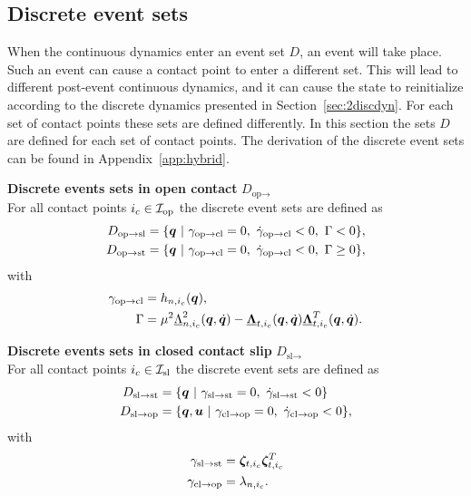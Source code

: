\documentclass[../DC2017114Bouma.tex]{subfiles}
\begin{document}
\subsection{Discrete event sets}\label{sec:2event}
When the continuous dynamics enter an event set $D$, an event will take place. Such an event can cause a contact point to enter a different set. This will lead to different post-event continuous dynamics, and it can cause the state to reinitialize according to the discrete dynamics presented in Section~\ref{sec:2discdyn}. For each set of contact points these sets are defined differently. In this section the sets $D$ are defined for each set of contact points. The derivation of the discrete event sets can be found in Appendix~\ref{app:hybrid}.

\textbf{Discrete events sets in open contact} $D_{\text{op}\rightarrow}$\\
For all contact points $i_c\in\mathcal{I}_{\text{op}}$ the discrete event sets are defined as
\begin{align}
D_{\text{op}\rightarrow\text{sl}} &= \{ \qb\ |\ \gamma_{\text{op}\rightarrow\text{cl}} = 0,\ \dot{\gamma}_{\text{op}\rightarrow\text{cl}} < 0,\ \Gamma < 0 \},\\
D_{\text{op}\rightarrow\text{st}} &= \{ \qb\ |\ \gamma_{\text{op}\rightarrow\text{cl}} = 0,\ \dot{\gamma}_{\text{op}\rightarrow\text{cl}} < 0,\ \Gamma \geq 0 \},
\end{align}
with
\begin{align}
\gamma_{\text{op}\rightarrow\text{cl}} &= h_{n,i_c}({\boldsymbol{q}}),\\
\Gamma &= \mu^2\underline{\Lambda}^2_{n,i_c}({\boldsymbol{q}},\dot{{\boldsymbol{q}}})-\underline{\boldsymbol{\Lambda}}_{t,i_c}({\boldsymbol{q}},\dot{{\boldsymbol{q}}})\underline{\boldsymbol{\Lambda}}^T_{t,i_c}({\boldsymbol{q}},\dot{{\boldsymbol{q}}}).
\end{align}

\textbf{Discrete events sets in closed contact slip} $D_{\text{sl}\rightarrow}$\\
For all contact points $i_c\in\mathcal{I}_{\text{sl}}$ the discrete event sets are defined as
\begin{align}
D_{\text{sl}\rightarrow\text{st}} &= \{ \qb\ |\ \gamma_{\text{sl}\rightarrow\text{st}} = 0,\ \dot{\gamma}_{\text{sl}\rightarrow\text{st}} < 0\}\\
D_{\text{sl}\rightarrow\text{op}} &= \{ \qb,\ub\ |\ \gamma_{\text{cl}\rightarrow\text{op}} = 0,\ \dot{\gamma}_{\text{cl}\rightarrow\text{op}} < 0\},
\end{align}
with 
\begin{align}
\gamma_{\text{sl}\rightarrow\text{st}} &= \boldsymbol{\zeta}_{t,i_c}\boldsymbol{\zeta}_{t,i_c}^T\\
\gamma_{\text{cl}\rightarrow\text{op}} &= \lambda_{n,i_c}.
\end{align}
\end{document}
